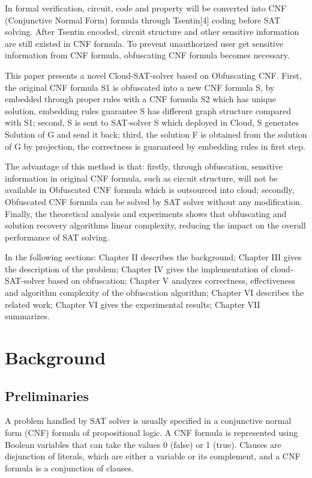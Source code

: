 \documentclass[runningheads,a4paper]{llncs}
\begin{document}
In formal verification, circuit, code and property will be converted into CNF (Conjunctive Normal Form) formula through Tsentin[4] coding before SAT solving. After Tsentin encoded, circuit structure and other sensitive information are still existed in CNF formula. To prevent unauthorized user get sensitive information from CNF formula, obfuscating CNF formula becomes necessary.

This paper presents a novel Cloud-SAT-solver based on Obfuscating CNF. First, the original CNF formula S1 is obfuscated into a new CNF formula S, by embedded through proper rules with a CNF formula S2 which has unique solution, embedding rules guarantee S has different graph structure compared with S1; second, S is sent to SAT-solver S which deployed in Cloud, S generates Solution of G and send it back; third, the solution F is obtained from the solution of G by projection, the correctness is guaranteed by embedding rules in first step.

The advantage of this method is that: firstly, through obfuscation, sensitive information in original CNF formula, such as circuit structure, will not be available in Obfuscated CNF formula which is outsourced into cloud; secondly, Obfuscated CNF formula can be solved by SAT solver without any modification. Finally, the theoretical analysis and experiments shows that obfuscating and solution recovery algorithms linear complexity, reducing the impact on the overall performance of SAT solving.

In the following sections: Chapter II describes the background; Chapter III gives the description of the problem; Chapter IV gives the implementation of cloud-SAT-solver based on obfuscation; Chapter V analyzes correctness, effectiveness and algorithm complexity of the obfuscation algorithm; Chapter VI describes the related work; Chapter VI gives the experimental results; Chapter VII summarizes.

\section{Background}
\subsection{Preliminaries}

A problem handled by SAT solver is usually specified in a conjunctive normal form (CNF) formula of propositional logic. A CNF formula is represented using Boolean variables that can take the values 0 (false) or 1 (true). Clauses are disjunction of literals, which are either a variable or its complement, and a CNF formula is a conjunction of clauses.
\end{document}
